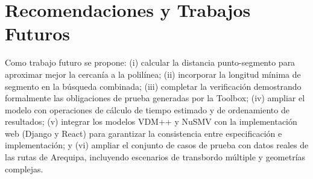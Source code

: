 \section{Recomendaciones y Trabajos Futuros}
\label{sec:recomendaciones}

Como trabajo futuro se propone: (i) calcular la distancia punto-segmento
para aproximar mejor la cercanía a la polilínea; (ii) incorporar la
longitud mínima de segmento en la búsqueda combinada; (iii) completar la
verificación demostrando formalmente las obligaciones de prueba generadas
por la Toolbox; (iv) ampliar el modelo con operaciones de cálculo de
tiempo estimado y de ordenamiento de resultados; (v) integrar los
modelos VDM++ y NuSMV con la implementación web (Django y React) para
garantizar la consistencia entre especificación e implementación; y
(vi) ampliar el conjunto de casos de prueba con datos reales de las rutas
de Arequipa, incluyendo escenarios de transbordo múltiple y geometrías
complejas.
